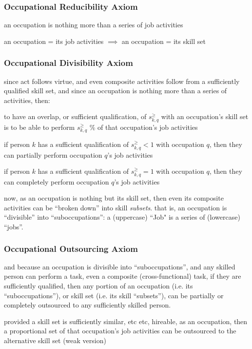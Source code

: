 \documentclass{elsarticle} %
\begin{document}
\subsubsection{Occupational Reducibility Axiom}
an occupation is nothing more than a series of job activities

an occupation = its job activities $\implies$ an occupation = its skill set

\subsubsection{Occupational Divisibility Axiom}
since act follows virtue, and even composite activities follow from a sufficiently qualified skill set, and since an occupation is nothing more than a series of activities, then:

to have an overlap, or sufficient qualification, of $s_{k,q}^{\geq}$ with an occupation's skill set is to be able to perform $s_{k,q}^{\geq}$ \% of that occupation's job activities

if person $k$ has a sufficient qualification of $s_{k,q}^{\geq} < 1$ with occupation $q$, then they can partially perform occupation $q$'s job activities

if person $k$ has a sufficient qualification of $s_{k,q}^{\geq} = 1$ with occupation $q$, then they can completely perform occupation $q$'s job activities

now, as an occupation is nothing but its skill set, then even its composite activities can be ``broken down'' into skill \textit{subsets}. that is, an occupation is ``divisible'' into ``suboccupations'': a (uppercase) ``Job" is a series of (lowercase) ``jobs''.

\subsubsection{Occupational Outsourcing Axiom}
and because an occupation is divisible into ``suboccupations'', and any skilled person can perform a task, even a composite (cross-functional) task, if they are sufficiently qualified, then any portion of an occupation (i.e. its ``suboccupations''), or skill set (i.e. its skill ``subsets''), can be partially or completely outsourced to any sufficiently skilled person.

provided a skill set is sufficiently similar, etc etc, hireable, as an occupation, then a proportional set of that occupation's job activities can be outsourced to the alternative skill set (weak version)
\end{document}
